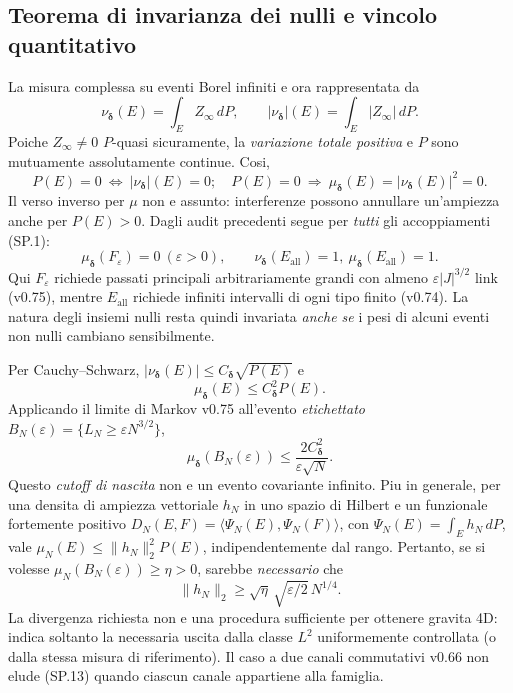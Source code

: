\documentclass[11pt,a4paper]{article}
\begin{document}
\subsection*{Teorema di invarianza dei nulli e vincolo quantitativo}
La misura complessa su eventi Borel infiniti e ora rappresentata da
\begin{equation}
\nu_{\boldsymbol\delta}(E)=\int_EZ_\infty\,dP,\qquad
|\nu_{\boldsymbol\delta}|(E)=\int_E|Z_\infty|\,dP.\tag{SP.12}
\end{equation}
Poiche $Z_\infty\ne0$ $P$-quasi sicuramente, la \emph{variazione totale positiva} e $P$ sono mutuamente assolutamente continue. Cosi,
\begin{equation}
\boxed{P(E)=0\ \Longleftrightarrow\ |\nu_{\boldsymbol\delta}|(E)=0;
\quad P(E)=0\ \Longrightarrow\ \mu_{\boldsymbol\delta}(E)=|\nu_{\boldsymbol\delta}(E)|^2=0.}
\tag{SP.13}
\end{equation}
Il verso inverso per $\mu$ non e assunto: interferenze possono annullare un'ampiezza anche per $P(E)>0$. Dagli audit precedenti segue per \emph{tutti} gli accoppiamenti (SP.1):
\begin{equation}
\boxed{\mu_{\boldsymbol\delta}(F_\varepsilon)=0\ (\varepsilon>0),\qquad
\nu_{\boldsymbol\delta}(E_{\mathrm{all}})=1,\ \mu_{\boldsymbol\delta}(E_{\mathrm{all}})=1.}
\tag{SP.14}
\end{equation}
Qui $F_\varepsilon$ richiede passati principali arbitrariamente grandi con almeno $\varepsilon |J|^{3/2}$ link (v0.75), mentre $E_{\mathrm{all}}$ richiede infiniti intervalli di ogni tipo finito (v0.74). La natura degli insiemi nulli resta quindi invariata \emph{anche se} i pesi di alcuni eventi non nulli cambiano sensibilmente.

Per Cauchy--Schwarz, $|\nu_{\boldsymbol\delta}(E)|\le C_{\boldsymbol\delta}\sqrt{P(E)}$ e
\begin{equation}
\boxed{\mu_{\boldsymbol\delta}(E)\le C_{\boldsymbol\delta}^2P(E).}
\tag{SP.15}
\end{equation}
Applicando il limite di Markov v0.75 all'evento \emph{etichettato} $B_N(\varepsilon)=\{L_N\ge\varepsilon N^{3/2}\}$,
\begin{equation}
\mu_{\boldsymbol\delta}(B_N(\varepsilon))\le
\frac{2C_{\boldsymbol\delta}^2}{\varepsilon\sqrt N}.\tag{SP.16}
\end{equation}
Questo \emph{cutoff di nascita} non e un evento covariante infinito. Piu in generale, per una densita di ampiezza vettoriale $h_N$ in uno spazio di Hilbert e un funzionale fortemente positivo $D_N(E,F)=\langle\Psi_N(E),\Psi_N(F)\rangle$, con $\Psi_N(E)=\int_Eh_N\,dP$, vale $\mu_N(E)\le\|h_N\|_2^2P(E)$, indipendentemente dal rango. Pertanto, se si volesse $\mu_N(B_N(\varepsilon))\ge\eta>0$, sarebbe \emph{necessario} che
\begin{equation}
\boxed{\|h_N\|_2\ge\sqrt\eta\,\sqrt{\varepsilon/2}\,N^{1/4}.}
\tag{SP.17}
\end{equation}
La divergenza richiesta non e una procedura sufficiente per ottenere gravita 4D: indica soltanto la necessaria uscita dalla classe $L^2$ uniformemente controllata (o dalla stessa misura di riferimento). Il caso a due canali commutativi v0.66 non elude (SP.13) quando ciascun canale appartiene alla famiglia.
\end{document}

